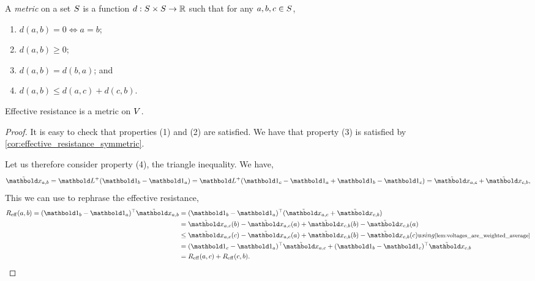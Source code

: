 \begin{defn}[Metric] A \emph{metric} on a set $S$ is a function $d : S \times S \to \mathbb{R}$ such that for any $a, b, c \in S$, \begin{enumerate}
    \item $d(a,b) = 0 \iff a = b$;
    \item $d(a,b) \geq 0$;
    \item $d(a,b) = d(b,a)$; and
    \item $d(a,b) \leq d(a,c) + d(c,b)$.
\end{enumerate}
\end{defn}
\begin{lem}
Effective resistance is a metric on $V$.
\end{lem}
\begin{proof} It is easy to check that properties (1) and (2) are satisfied. We have that property (3) is satisfied by \cref{cor:effective_resistance_symmetric}.

Let us therefore consider property (4), the triangle inequality. We have, \begin{align*}
    \elx_{a,b} = \pinv{\mL}(\vOne_b - \vOne_a) = \pinv{\mL}(\vOne_c - \vOne_a + \vOne_b - \vOne_c) = \elx_{a,c} + \elx_{c,b},
\end{align*} This we can use to rephrase the effective resistance, \begin{align*}
    \Reff(a,b) = \trans{(\vOne_b - \vOne_a)}\elx_{a,b} &= \trans{(\vOne_b - \vOne_a)}(\elx_{a,c} + \elx_{c,b}) \\
    &= \elx_{a,c}(b) - \elx_{a,c}(a) + \elx_{c,b}(b) - \elx_{c,b}(a) \\
    &\leq \elx_{a,c}(c) - \elx_{a,c}(a) + \elx_{c,b}(b) - \elx_{c,b}(c) \margintag{using \cref{lem:voltages_are_weighted_average}} \\
    &= \trans{(\vOne_c - \vOne_a)}\elx_{a,c} + \trans{(\vOne_b - \vOne_c)}\elx_{c,b} \\
    &= \Reff(a,c) + \Reff(c,b). \qedhere
\end{align*}
\end{proof}